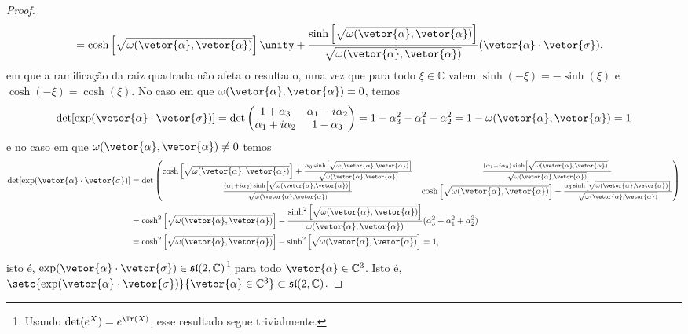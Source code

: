 \begin{proof}
\begin{align*}
        &= \cosh\left[\sqrt{\omega(\vetor{\alpha},\vetor{\alpha})}\right] \unity + \frac{\sinh\left[\sqrt{\omega(\vetor{\alpha}, \vetor{\alpha})}\right]}{\sqrt{\omega(\vetor{\alpha},\vetor{\alpha})}}(\vetor{\alpha}\cdot\vetor{\sigma}),
    \end{align*}
    em que a ramificação da raiz quadrada não afeta o resultado, uma vez que para todo \(\xi \in \mathbb{C}\) valem \(\sinh(-\xi) = -\sinh(\xi)\) e \(\cosh(-\xi) = \cosh(\xi)\).
    No caso em que \(\omega(\vetor{\alpha}, \vetor{\alpha}) = 0\), temos
    \begin{equation*}
        \det[\exp(\vetor{\alpha}\cdot\vetor{\sigma})] = \det \begin{pmatrix}
            1 + \alpha_3 & \alpha_1 - i \alpha_2\\
            \alpha_1 + i \alpha_2 & 1 - \alpha_3
        \end{pmatrix} = 1 - \alpha_3^2 - \alpha_1^2 - \alpha_2^2 = 1 - \omega(\vetor{\alpha}, \vetor{\alpha}) = 1
    \end{equation*}
    e no caso em que \(\omega(\vetor{\alpha}, \vetor{\alpha}) \neq 0\) temos
    \begin{align*}
        \det[\exp(\vetor{\alpha}\cdot\vetor{\sigma})]
        &= \det \begin{pmatrix}
            \cosh\left[\sqrt{\omega(\vetor{\alpha},\vetor{\alpha})}\right] + \frac{\alpha_3 \sinh\left[\sqrt{\omega(\vetor{\alpha},\vetor{\alpha})}\right]}{\sqrt{\omega(\vetor{\alpha},\vetor{\alpha})}} & \frac{(\alpha_1 - i \alpha_2) \sinh\left[\sqrt{\omega(\vetor{\alpha},\vetor{\alpha})}\right]}{\sqrt{\omega(\vetor{\alpha},\vetor{\alpha})}}\\
            \frac{(\alpha_1 + i \alpha_2) \sinh\left[\sqrt{\omega(\vetor{\alpha},\vetor{\alpha})}\right]}{\sqrt{\omega(\vetor{\alpha},\vetor{\alpha})}} & \cosh\left[\sqrt{\omega(\vetor{\alpha},\vetor{\alpha})}\right] - \frac{\alpha_3 \sinh\left[\sqrt{\omega(\vetor{\alpha},\vetor{\alpha})}\right]}{\sqrt{\omega(\vetor{\alpha},\vetor{\alpha})}}\\
        \end{pmatrix}\\
        &= \cosh^2\left[\sqrt{\omega(\vetor{\alpha},\vetor{\alpha})}\right] - \frac{\sinh^2\left[\sqrt{\omega(\vetor{\alpha},\vetor{\alpha})}\right]}{\omega(\vetor{\alpha}, \vetor{\alpha})}(\alpha_3^2 + \alpha_1^2 + \alpha_2^2)\\
        &= \cosh^2\left[\sqrt{\omega(\vetor{\alpha},\vetor{\alpha})}\right] - \sinh^2\left[\sqrt{\omega(\vetor{\alpha},\vetor{\alpha})}\right] = 1,
    \end{align*}
    isto é, \(\exp(\vetor{\alpha}\cdot \vetor{\sigma}) \in \mathfrak{sl}(2, \mathbb{C})\)\footnote{Usando \(\det(e^X) = e^{\Tr(X)}\), esse resultado segue trivialmente.} para todo \(\vetor{\alpha} \in \mathbb{C}^3\). Isto é, \(\setc{\exp(\vetor{\alpha}\cdot\vetor{\sigma})}{\vetor{\alpha} \in \mathbb{C}^3} \subset \mathfrak{sl}(2,\mathbb{C})\).


\end{proof}

